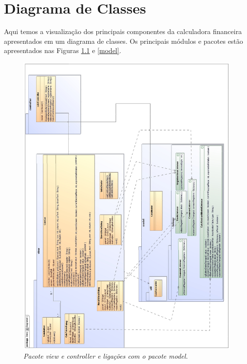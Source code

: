 \chapter{Diagrama de Classes} \label{DiagramaClasses}

Aqui temos a visualização dos principais componentes da calculadora financeira apresentados em um diagrama de classes. Os principais módulos e pacotes estão apresentados nas Figuras \ref{view} e \ref{model}.

\begin{figure}[!h]
\centering
 \includegraphics[scale=0.4]{Diagrama1_2.eps}
 \caption{\it Pacote view e controller e ligações com o pacote model.} \label{view}
\end{figure}

